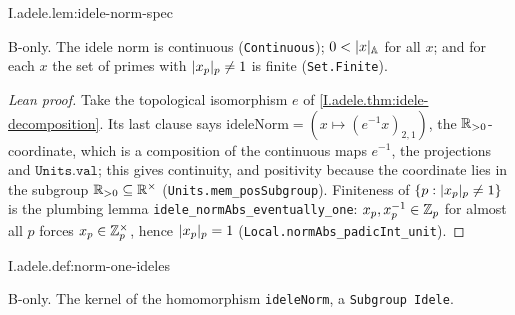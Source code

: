 \begin{lemma}
\bonly
{}
\end{lemma}
\begin{tfformal}{I.adele.lem:idele-norm-spec}
\begin{tffidelity}
B-only. The idele norm is continuous (\texttt{Continuous}); $0<\lvert x\rvert_{\mathbb{A}}$ for all $x$; and for each $x$ the set of primes with $\lvert x_p\rvert_p\neq1$ is finite (\texttt{Set.Finite}).
\end{tffidelity}
\end{tfformal}
\begin{proof}[Lean proof]
Take the topological isomorphism $e$ of \cref{I.adele.thm:idele-decomposition}. Its last clause says $\mathrm{ideleNorm}=(x\mapsto (e^{-1}x)_{2,1})$, the $\mathbb{R}_{>0}$-coordinate, which is a composition of the continuous maps $e^{-1}$, the projections and $\texttt{Units.val}$; this gives continuity, and positivity because the coordinate lies in the subgroup $\mathbb{R}_{>0}\subseteq\mathbb{R}^\times$ (\texttt{Units.mem\_posSubgroup}). Finiteness of $\{p:\lvert x_p\rvert_p\ne1\}$ is the plumbing lemma \texttt{idele\_normAbs\_eventually\_one}: $x_p,x_p^{-1}\in\mathbb{Z}_p$ for almost all $p$ forces $x_p\in\mathbb{Z}_p^\times$, hence $\lvert x_p\rvert_p=1$ (\texttt{Local.normAbs\_padicInt\_unit}).
\end{proof}

\begin{definition}
\bonly
{}
\end{definition}
\begin{tfformal}{I.adele.def:norm-one-ideles}
\begin{tffidelity}
B-only. The kernel of the homomorphism \texttt{ideleNorm}, a \texttt{Subgroup Idele}.
\end{tffidelity}
\end{tfformal}

